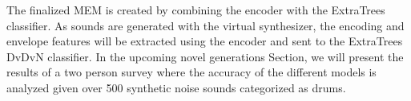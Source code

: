 \documentclass[\main/thesis.tex]{subfiles}
\begin{document}
The finalized MEM is created by combining the encoder with the ExtraTrees classifier. As sounds are generated with the virtual synthesizer, the encoding and envelope features will be extracted using the encoder and sent to the ExtraTrees DvDvN classifier. In the upcoming novel generations Section, we will present the results of a two person survey where the accuracy of the different models is analyzed given over 500 synthetic noise sounds categorized as drums. 









    


\end{document}
